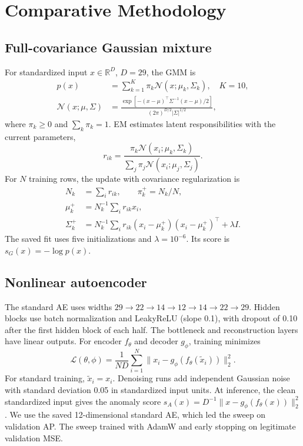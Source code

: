\documentclass[conference]{IEEEtran}
\begin{document}
\section{Comparative Methodology}
\subsection{Full-covariance Gaussian mixture}
For standardized input $x\in\mathbb R^{D}$, $D=29$, the GMM is
\begin{align}
p(x)&=\sum_{k=1}^{K}\pi_k\mathcal N(x;\mu_k,\Sigma_k), \quad K=10,\\
\mathcal N(x;\mu,\Sigma)
&=\frac{\exp[-(x-\mu)^\top\Sigma^{-1}(x-\mu)/2]}
        {(2\pi)^{D/2}|\Sigma|^{1/2}},
\end{align}
where $\pi_k\ge0$ and $\sum_k\pi_k=1$. EM estimates latent responsibilities with the current parameters,
\begin{equation}
r_{ik}=\frac{\pi_k\mathcal N(x_i;\mu_k,\Sigma_k)}
{\sum_j\pi_j\mathcal N(x_i;\mu_j,\Sigma_j)}.
\end{equation}
For $N$ training rows, the update with covariance regularization is
\begin{align}
N_k &= \sum_i r_{ik}, \qquad \pi_k^{+}=N_k/N,\\
\mu_k^{+} &= N_k^{-1}\sum_i r_{ik}x_i,\\
\Sigma_k^{+} &= N_k^{-1}\sum_i r_{ik}(x_i-\mu_k^{+})
                     (x_i-\mu_k^{+})^\top + \lambda I .
\end{align}
The saved fit uses five initializations and $\lambda=10^{-6}$. Its score is $s_G(x)=-\log p(x)$.

\subsection{Nonlinear autoencoder}
The standard AE uses widths $29\to22\to14\to12\to14\to22\to29$. Hidden blocks use batch normalization and LeakyReLU (slope 0.1), with dropout of 0.10 after the first hidden block of each half. The bottleneck and reconstruction layers have linear outputs. For encoder $f_\theta$ and decoder $g_\phi$, training minimizes
\begin{equation}
\mathcal L(\theta,\phi)=\frac{1}{ND}\sum_{i=1}^N
\|x_i-g_\phi(f_\theta(\tilde x_i))\|_2^2 .
\end{equation}
For standard training, $\tilde x_i=x_i$. Denoising runs add independent Gaussian noise with standard deviation 0.05 in standardized input units. At inference, the clean standardized input gives the anomaly score
$s_A(x)=D^{-1}\|x-g_\phi(f_\theta(x))\|_2^2$.
We use the saved 12-dimensional standard AE, which led the sweep on validation AP. The sweep trained with AdamW and early stopping on legitimate validation MSE.
\end{document}
